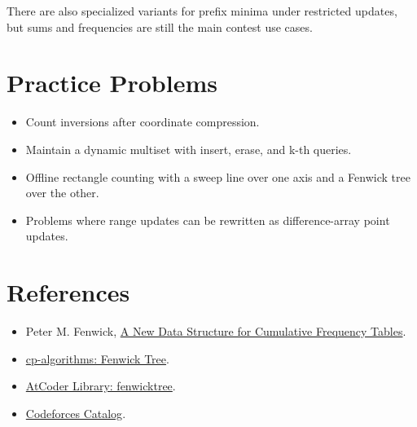 There are also specialized variants for prefix minima under restricted updates, but sums and frequencies are still the
main contest use cases.

\section*{Practice Problems}

\begin{itemize}
  \item Count inversions after coordinate compression.
  \item Maintain a dynamic multiset with insert, erase, and k-th queries.
  \item Offline rectangle counting with a sweep line over one axis and a Fenwick tree over the other.
  \item Problems where range updates can be rewritten as difference-array point updates.
\end{itemize}

\section*{References}

\begin{itemize}
  \item Peter M. Fenwick, \href{https://www.yumpu.com/en/document/view/43186239/a-new-data-structure-for-cumulative-frequency-tables-citeseerx}{A New Data Structure for Cumulative Frequency Tables}.
  \item \href{https://cp-algorithms.com/data_structures/fenwick.html}{cp-algorithms: Fenwick Tree}.
  \item \href{https://atcoder.github.io/ac-library/production/document_en/fenwicktree.html}{AtCoder Library: fenwicktree}.
  \item \href{https://codeforces.com/catalog}{Codeforces Catalog}.
\end{itemize}
